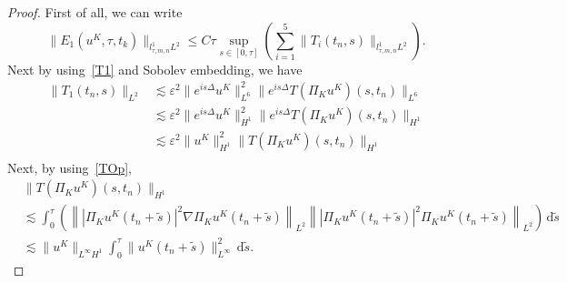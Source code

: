 \documentclass[10pt,a4paper]{article}
\newtheorem{remark}[theorem]{Remark}
\begin{document}

  \begin{proof}
    First of all, we can write
    \begin{equation}\label{F1lplq}
      \|E_1(u^K, \tau, t_k)\|_{l^1_{\tau,m,n}L^2} \leq C \tau \sup_{s \in [0,\tau]}
      \left(\sum_{i=1}^5 \|T_i(t_n,s)\|_{l^1_{\tau,m,n}L^2} \right).
    \end{equation}
    Next by using~\eqref{T1} and Sobolev embedding, we have 
    \begin{equation}
      \begin{aligned}
        \|T_1(t_n,s)\|_{L^2} &\lesssim \varepsilon^2\|e^{is\Delta}u^K\|^2_{L^6} \|e^{is\Delta} T(\Pi_K u^K)(s,t_n)\|_{L^6} \\ 
        &\lesssim \varepsilon^2\|e^{is\Delta}u^K\|^2_{H^1} \|e^{is\Delta} T(\Pi_K u^K)(s,t_n)\|_{H^1} \\ 
        &\lesssim \varepsilon^2\|u^K\|^2_{H^1} \|T(\Pi_K u^K)(s,t_n)\|_{H^1} \\ 
      \end{aligned}
    \end{equation}
    Next, by using~\eqref{TOp},
    \begin{equation}\label{TH1}
      \begin{aligned}
        & \|T(\Pi_K u^K)(s,t_n)\|_{H^1} \\ & \lesssim 
        \int_0^\tau \left( 
        \left\| |\Pi_K u^K(t_n+\tilde{s})|^2 \nabla\Pi_K u^K(t_n+\tilde{s}) \right\|_{L^2}
        \left\| |\Pi_K u^K(t_n+\tilde{s})|^2 \Pi_K u^K(t_n+\tilde{s}) \right\|_{L^2}
        \right)\,\mathrm{d}\tilde{s} \\ 
        & \lesssim \|u^K\|_{L^\infty H^1} \int_0^\tau
        \|u^K(t_n+\tilde{s})\|_{L^\infty}^2\,\mathrm{d}\tilde{s}.
      \end{aligned}

\end{equation}
\end{proof}
\end{document}
